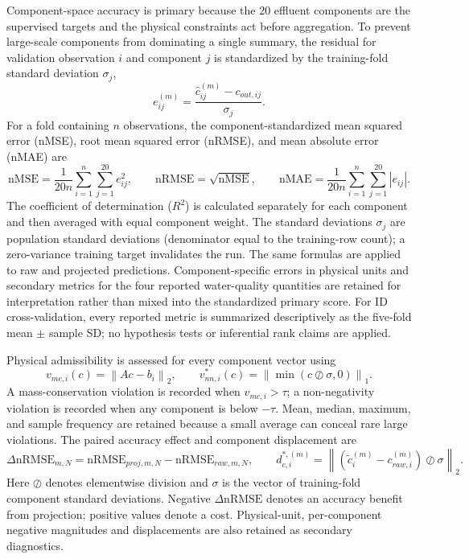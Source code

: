 \documentclass[a4paper,fleqn]{cas-sc}
\begin{document}
Component-space accuracy is primary because the 20 effluent components are the supervised targets and the physical constraints act before aggregation. To prevent large-scale components from dominating a single summary, the residual for validation observation $i$ and component $j$ is standardized by the training-fold standard deviation $\sigma_j$,
\begin{equation}
e_{ij}^{(m)}=\frac{\hat c_{ij}^{(m)}-c_{out,ij}}{\sigma_j}.
\end{equation}
For a fold containing $n$ observations, the component-standardized mean squared error (nMSE), root mean squared error (nRMSE), and mean absolute error (nMAE) are
\begin{equation}
\mathrm{nMSE}=\frac{1}{20n}\sum_{i=1}^{n}\sum_{j=1}^{20}e_{ij}^{2},\qquad
\mathrm{nRMSE}=\sqrt{\mathrm{nMSE}},\qquad
\mathrm{nMAE}=\frac{1}{20n}\sum_{i=1}^{n}\sum_{j=1}^{20}|e_{ij}|.
\end{equation}
The coefficient of determination ($R^2$) is calculated separately for each component and then averaged with equal component weight. The standard deviations $\sigma_j$ are population standard deviations (denominator equal to the training-row count); a zero-variance training target invalidates the run. The same formulas are applied to raw and projected predictions. Component-specific errors in physical units and secondary metrics for the four reported water-quality quantities are retained for interpretation rather than mixed into the standardized primary score. For ID cross-validation, every reported metric is summarized descriptively as the five-fold mean $\pm$ sample SD; no hypothesis tests or inferential rank claims are applied.

Physical admissibility is assessed for every component vector using
\begin{equation}
\label{eq:physical_residuals}
v_{mc,i}(c)=\left\|Ac-b_i\right\|_2,\qquad
v_{nn,i}^{*}(c)=\left\|\min(c\oslash\sigma,0)\right\|_1.
\end{equation}
A mass-conservation violation is recorded when $v_{mc,i}>\tau$; a non-negativity violation is recorded when any component is below $-\tau$. Mean, median, maximum, and sample frequency are retained because a small average can conceal rare large violations. The paired accuracy effect and component displacement are
\begin{equation}
\Delta\mathrm{nRMSE}_{m,N}=\mathrm{nRMSE}_{proj,m,N}-\mathrm{nRMSE}_{raw,m,N},\qquad
d_{c,i}^{*,(m)}=\left\|\left(\tilde c_i^{(m)}-c_{raw,i}^{(m)}\right)\oslash\sigma\right\|_2.
\end{equation}
Here $\oslash$ denotes elementwise division and $\sigma$ is the vector of training-fold component standard deviations. Negative $\Delta\mathrm{nRMSE}$ denotes an accuracy benefit from projection; positive values denote a cost. Physical-unit, per-component negative magnitudes and displacements are also retained as secondary diagnostics.
\end{document}
